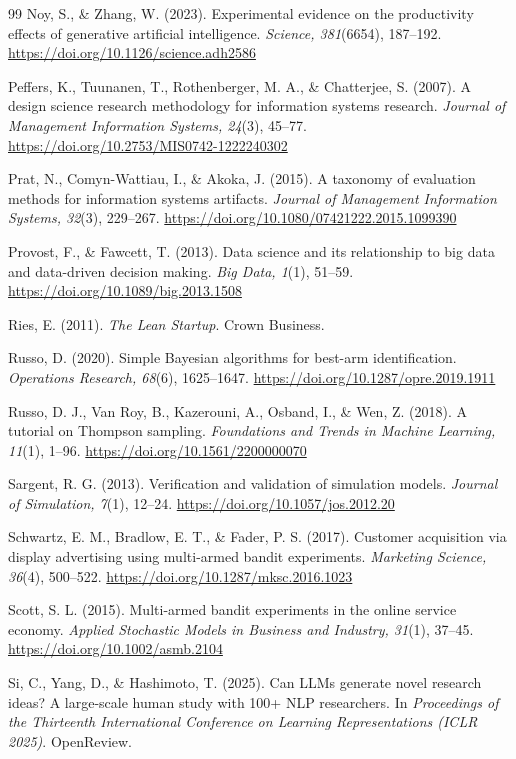 \documentclass[preprint,12pt,authoryear]{elsarticle}
\providecommand{\doi}[1]{\url{https://doi.org/#1}}
\theoremstyle{definition}
\begin{document}
\begin{thebibliography}{99}
 Noy, S., \& Zhang, W. (2023). Experimental evidence on the productivity effects of generative artificial intelligence. \textit{Science, 381}(6654), 187--192. \doi{10.1126/science.adh2586}

 Peffers, K., Tuunanen, T., Rothenberger, M. A., \& Chatterjee, S. (2007). A design science research methodology for information systems research. \textit{Journal of Management Information Systems, 24}(3), 45--77. \doi{10.2753/MIS0742-1222240302}

 Prat, N., Comyn-Wattiau, I., \& Akoka, J. (2015). A taxonomy of evaluation methods for information systems artifacts. \textit{Journal of Management Information Systems, 32}(3), 229--267. \doi{10.1080/07421222.2015.1099390}

 Provost, F., \& Fawcett, T. (2013). Data science and its relationship to big data and data-driven decision making. \textit{Big Data, 1}(1), 51--59. \doi{10.1089/big.2013.1508}

 Ries, E. (2011). \textit{The Lean Startup}. Crown Business.

 Russo, D. (2020). Simple Bayesian algorithms for best-arm identification. \textit{Operations Research, 68}(6), 1625--1647. \doi{10.1287/opre.2019.1911}

 Russo, D. J., Van Roy, B., Kazerouni, A., Osband, I., \& Wen, Z. (2018). A tutorial on Thompson sampling. \textit{Foundations and Trends in Machine Learning, 11}(1), 1--96. \doi{10.1561/2200000070}

 Sargent, R. G. (2013). Verification and validation of simulation models. \textit{Journal of Simulation, 7}(1), 12--24. \doi{10.1057/jos.2012.20}

 Schwartz, E. M., Bradlow, E. T., \& Fader, P. S. (2017). Customer acquisition via display advertising using multi-armed bandit experiments. \textit{Marketing Science, 36}(4), 500--522. \doi{10.1287/mksc.2016.1023}

 Scott, S. L. (2015). Multi-armed bandit experiments in the online service economy. \textit{Applied Stochastic Models in Business and Industry, 31}(1), 37--45. \doi{10.1002/asmb.2104}

 Si, C., Yang, D., \& Hashimoto, T. (2025). Can LLMs generate novel research ideas? A large-scale human study with 100+ NLP researchers. In \textit{Proceedings of the Thirteenth International Conference on Learning Representations (ICLR 2025)}. OpenReview.


\end{thebibliography}
\end{document}
